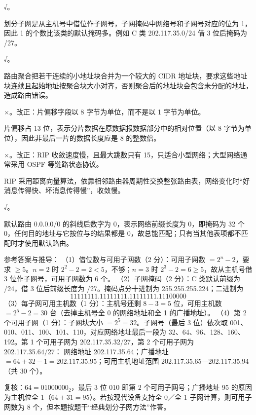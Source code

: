 \documentclass[a4paper,11pt]{article}
\begin{document}
\q √。\begin{analysis}划分子网是从主机号中借位作子网号，子网掩码中网络号和子网号对应的位为 1，因此 1 的个数比该类的默认掩码多。例如 C 类 202.117.35.0/24 借 3 位后掩码为 /27。\end{analysis}

\q √。\begin{analysis}路由聚合把若干连续的小地址块合并为一个较大的 CIDR 地址块，要求这些地址块连续且起始地址按聚合块大小对齐，否则聚合后的地址块会包含未分配的地址，造成路由错误。\end{analysis}

\q ×。改正：片偏移字段以 8 字节为单位，而不是以 1 字节为单位。\begin{analysis}片偏移占 13 位，表示分片数据在原数据报数据部分中的相对位置（以 8 字节为单位），因此非最后一片的数据长度应是 8 的整数倍。\end{analysis}

\q ×。改正：RIP 收敛速度慢，且最大跳数只有 15，只适合小型网络；大型网络通常采用 OSPF 等链路状态协议。\begin{analysis}RIP 采用距离向量算法，依靠相邻路由器周期性交换整张路由表，网络变化时“好消息传得快、坏消息传得慢”，收敛慢。\end{analysis}

\q √。\begin{analysis}默认路由 0.0.0.0/0 的斜线后数字为 0，表示网络前缀长度为 0，即掩码为 32 个 0，任何目的地址与它按位与的结果都是 0，故总能匹配；只有当其他表项都不匹配时才使用默认路由。\end{analysis}


\q 参考答案与推导：
（1）借位数与可用子网数（2 分）：可用子网数 $=2^{n}-2$，要求 $\ge 5$。$n=2$ 时 $2^{2}-2=2<5$，不够；$n=3$ 时 $2^{3}-2=6\ge 5$，故从主机号借 3 位作子网号，可用子网数为 6 个。
（2）子网掩码（2 分）：C 类默认前缀为 /24，借 3 位后前缀长度为 /27。掩码点分十进制为 255.255.255.224；二进制为
\[
11111111.11111111.11111111.11100000
\]
（3）每子网可用主机数（1 分）：主机号还剩 $8-3=5$ 位，可用主机数 $=2^{5}-2=30$ 台（去掉主机号全 0 的网络地址和全 1 的广播地址）。
（4）第 2 个可用子网（1 分）：子网块大小 $=2^{5}=32$。子网号（最后 3 位）依次取 001、010、011、100、101、110，对应网络地址最后一段为 32、64、96、128、160、192。第 1 个可用子网为 202.117.35.32/27，第 2 个可用子网为 202.117.35.64/27：
网络地址 202.117.35.64；广播地址 $=64+32-1=202.117.35.95$；可用主机地址范围 202.117.35.65—202.117.35.94（共 30 个）。
\begin{analysis}复核：$64=01000000_2$，最后 3 位 010 即第 2 个可用子网号；广播地址 95 的原因为主机位全 1（$64+31=95$）。若按现代设备支持全 0／全 1 子网计算，则可用子网数为 8 个，但本题按题干“经典划分子网方法”作答。\end{analysis}
\end{document}
